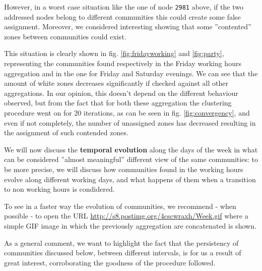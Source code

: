 \documentclass[12pt,a4paper]{article}
\begin{document}
However, in a worst case situation like the one of node \texttt{2981} above, if the two addressed nodes belong to different communities this could create some false assignment. Moreover, we considered interesting showing that some ''contented'' zones between communities could exist.

This situation is clearly shown in fig. \ref{fig:fridayworking} and \ref{fig:party}, representing the communities found respectively in the Friday working hours aggregation and in the one for Friday and Saturday evenings. We can see that the amount of white zones decreases significantly if checked against all other aggregations. In our opinion, this doesn't depend on the different behaviour observed, but from the fact that for both these aggregation the clustering procedure went on for 20 iterations, as can be seen in fig. \ref{fig:convergency}, and even if not completely, the number of unassigned zones has decreased resulting in the assignment of such contended zones.

We will now discuss the \textbf{temporal evolution} along the days of the week in what can be considered ''almost meaningful'' different view of the same communities: to be more precise, we will discuss how communities found in the working hours evolve along different working days, and what happens of them when a transition to non working hours is condidered.

To see in a faster way the evolution of communities, we recommend - when possible - to open the URL \href{http://s8.postimg.org/4cscwraxh/Week.gif}{http://s8.postimg.org/4cscwraxh/Week.gif} where a simple GIF image in which the previously aggregation are concatenated is shown.

As a general comment, we want to highlight the fact that the persistency of communities discussed below, between different intervals, is for us a result of great interest, corroborating the goodness of the procedure followed.
\end{document}
